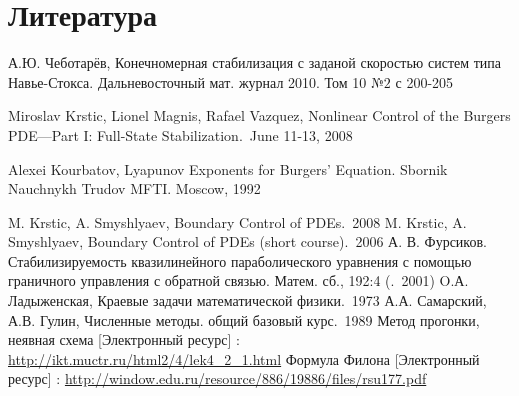 \section*{Литература}

\vspace{2em}

\begingroup
\renewcommand{\section}[2]{}%
\begin{thebibliography}{}
\bibitem{}
	А.Ю. Чеботарёв, Конечномерная стабилизация с заданой скоростью систем типа Навье-Стокса. Дальневосточный мат. журнал 2010. Том 10 $№2$ с 200-205

\bibitem{}
  Miroslav Krstic, Lionel Magnis, Rafael Vazquez, Nonlinear Control of the Burgers PDE—Part I: Full-State Stabilization.\ June 11-13, 2008

\bibitem{}
  Alexei Kourbatov, Lyapunov Exponents for Burgers’ Equation. Sbornik Nauchnykh Trudov MFTI. Moscow, 1992

    M. Krstic, A. Smyshlyaev, Boundary Control of PDEs.\ 2008
\bibitem{}
	M. Krstic, A. Smyshlyaev, Boundary Control of PDEs (short course).\ 2006
\bibitem{}
    А. В. Фурсиков. Стабилизируемость квазилинейного параболического уравнения с помощью граничного управления с обратной связью. Матем. сб., 192:4 (.\ 2001)
\bibitem{}
	O.А. Ладыженская, Краевые задачи математической физики.\ 1973
\bibitem{}
	А.А. Самарский, А.В. Гулин, Численные методы. общий базовый курс.\ 1989
\bibitem{}
	Метод прогонки, неявная схема [Электронный ресурс] : \url{http://ikt.muctr.ru/html2/4/lek4_2_1.html}
\bibitem{}
	Формула Филона [Электронный ресурс] : \url{http://window.edu.ru/resource/886/19886/files/rsu177.pdf}

\end{thebibliography}
\endgroup
